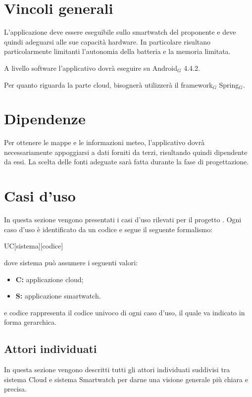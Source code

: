 \section{Vincoli generali}
L'applicazione deve essere eseguibile sullo smartwatch del proponente e deve quindi adeguarsi alle sue capacità hardware. In particolare risultano particolarmente limitanti l'autonomia della batteria e la memoria limitata.

A livello software l'applicativo dovrà eseguire su Android$_{G}$ 4.4.2.

Per quanto riguarda la parte cloud, bisognerà utilizzerà il framework$_{G}$ Spring$_{G}$.

\section{Dipendenze}
Per ottenere le mappe e le informazioni meteo, l'applicativo dovrà necessariamente appoggiarsi a dati forniti da terzi, risultando quindi dipendente da essi. La scelta delle fonti adeguate sarà fatta durante la fase di progettazione.

\section{Casi d'uso}
In questa sezione vengono presentati i casi d'uso rilevati per il progetto \CAPITOLATO{}. Ogni caso d'uso è identificato da un codice e segue il seguente formalismo: 
\begin{center}
UC[sistema][codice] 
\end{center} 
dove sistema può assumere i seguenti valori:
\begin{itemize}
\item \textbf{C:} applicazione cloud;
\item \textbf{S:} applicazione smartwatch.
\end{itemize}

e codice rappresenta il codice univoco di ogni caso d'uso, il quale va indicato in forma gerarchica.

\subsection{Attori individuati}
In questa sezione vengono descritti tutti gli attori individuati suddivisi tra sistema Cloud e sistema Smartwatch per darne una visione generale più chiara e precisa.

